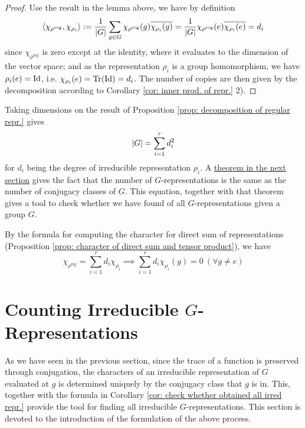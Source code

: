 \begin{proof}
    Use the result in the lemma above, we have by definition
    \[
        \left\langle \chi_{\rho^{\mathrm{reg}}}, \chi_{\rho_i} \right\rangle := \frac{1}{\left|G\right|} \sum_{g \in G} \chi_{\rho^{\mathrm{reg}}}(g) \overline{\chi_{\rho_i}(g)} = \frac{1}{\left|G\right|} \chi_{\rho^{\mathrm{reg}}}(e) \overline{\chi_{\rho_i}(e)} = d_i
    \]
    since $\chi_{\rho^{\mathrm{reg}}}$ is zero except at the identity, where it evaluates to the dimension of the vector space; and as the representation $\rho_i$ is a group homomorphism, we have $\rho_i(e) = \mathrm{Id}$, i.e. $\chi_{\rho_i}(e) = \operatorname{Tr}(\mathrm{Id}) = d_i$. The number of copies are then given by the decomposition according to Corollary \ref{cor: inner prod. of repr.} 2).
\end{proof}

\begin{corollary}\label{cor: check whether obtained all irred repr.}
    Taking dimensions on the result of Proposition \ref{prop: decomposition of regular repr.} gives
    \[
        \left|G\right| = \sum_{i = 1}^r d_i^2
    \]
    for $d_i$ being the degree of irreducible representation $\rho_i$. A \hyperref[thm: character of irred repres gives a basis of C(G)]{theorem in the next section} gives the fact that the number of $G$-representations is the same as the number of conjugacy classes of $G$. This equation, together with that theorem gives a tool to check whether we have found of all $G$-representations given a group $G$. 
\end{corollary}

\begin{corollary}
    By the formula for computing the character for direct sum of representations (Proposition \ref{prop: character of direct sum and tensor product}), we have 
    \[
        \chi_{\rho^{\mathrm{reg}}} = \sum_{i = 1}^r d_i \chi_{\rho_i} \implies \sum_{i = 1}^r d_i \chi_{\rho_i}(g) = 0\ (\forall g \neq e)
    \]
\end{corollary}

\section{Counting Irreducible $G$-Representations}

\textstart
As we have seen in the previous section, since the trace of a function is preserved through conjugation, the characters of an irreducible representation of $G$ evaluated at $g$ is determined uniquely by the conjugacy class that $g$ is in. This, together with the formula in Corollary \ref{cor: check whether obtained all irred repr.} provide the tool for finding all irreducible $G$-representations. This section is devoted to the introduction of the formulation of the above process.

